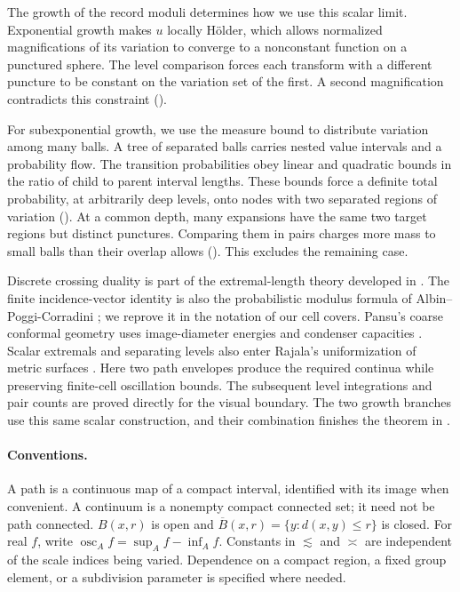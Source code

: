 \documentclass[11pt]{article}
\numberwithin{equation}{section}
\theoremstyle{definition}
\theoremstyle{remark}
\DeclareMathOperator{\osc}{osc}
\begin{document}
The growth of the record moduli determines how we use this scalar
limit. Exponential growth makes $u$ locally H\"older, which allows
normalized magnifications of its variation to converge to a nonconstant
function on a punctured sphere. The level comparison forces each transform with a different
puncture to be constant on the variation set of the first. A second
magnification contradicts this constraint ().

For subexponential growth, we use the measure bound to distribute
variation among many balls. A tree of separated balls carries nested
value intervals and a probability flow. The transition probabilities
obey linear and quadratic bounds in the ratio of child to parent
interval lengths. These bounds force a definite total probability,
at arbitrarily deep levels, onto nodes with two separated regions of variation
(). At a common depth, many expansions have the same
two target regions but distinct punctures. Comparing them in pairs
charges more mass to small balls than their overlap allows
(). This excludes the remaining case.

Discrete crossing duality is
part of the extremal-length theory developed in
\cite{Schramm,CFPSquaring}. The finite incidence-vector identity is
also the probabilistic modulus formula of
Albin--Poggi-Corradini \cite[Theorem 5.1]{AlbinPoggiCorradini}; we
reprove it in the notation of our cell covers. Pansu's coarse conformal geometry uses
image-diameter energies and condenser capacities \cite[\S6]{Pansu1989}.
Scalar extremals and separating levels also enter Rajala's
uniformization of metric surfaces \cite[Sections 4--6]{RajalaUniformization}.
Here two path envelopes produce the required continua while preserving
finite-cell oscillation bounds. The subsequent level integrations and
pair counts are proved directly for the visual boundary. The two growth
branches use this same scalar construction, and their combination
finishes the theorem in .

\paragraph{Conventions.}
A path is a continuous map of a compact interval, identified with its
image when convenient. A continuum is a
nonempty compact connected set; it need not be path connected.
$B(x,r)$ is open and $\overline B(x,r)=\{y:d(x,y)\le r\}$ is closed.
For real $f$, write $\osc_A f=\sup_A f-\inf_A f$.
Constants in $\lesssim$ and $\asymp$ are independent of the scale
indices being varied. Dependence on a compact region, a fixed group
element, or a subdivision parameter is specified where needed.
\end{document}
